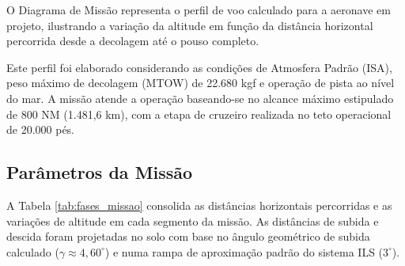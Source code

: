 O Diagrama de Missão representa o perfil de voo calculado para a aeronave em projeto, ilustrando a variação da altitude em função da distância horizontal percorrida desde a decolagem até o pouso completo.

Este perfil foi elaborado considerando as condições de Atmosfera Padrão (ISA), peso máximo de decolagem (MTOW) de 22.680 kgf e operação de pista ao nível do mar. A missão atende a operação baseando-se no alcance máximo estipulado de 800 NM (1.481,6 km), com a etapa de cruzeiro realizada no teto operacional de 20.000 pés.

\subsection{Parâmetros da Missão}

A Tabela \ref{tab:fases_missao} consolida as distâncias horizontais percorridas e as variações de altitude em cada segmento da missão. As distâncias de subida e descida foram projetadas no solo com base no ângulo geométrico de subida calculado ($\gamma \approx 4{,}60^{\circ}$) e numa rampa de aproximação padrão do sistema ILS ($3^{\circ}$).

\begin{table}[H]
    \centering
    \caption{Discriminação das fases da missão típica.}
    \label{tab:fases_missao}
    \vspace{0.2cm}
\end{table}

